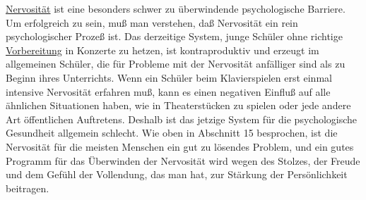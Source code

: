\hyperref[c1iii15]{Nervosität} ist eine besonders schwer zu überwindende psychologische Barriere.
Um erfolgreich zu sein, muß man verstehen, daß Nervosität ein rein psychologischer Prozeß ist.
Das derzeitige System, junge Schüler ohne richtige \hyperref[c1iii14]{Vorbereitung} in Konzerte zu hetzen, ist kontraproduktiv und erzeugt im allgemeinen Schüler, die für Probleme mit der Nervosität anfälliger sind als zu Beginn ihres Unterrichts.
Wenn ein Schüler beim Klavierspielen erst einmal intensive Nervosität erfahren muß, kann es einen negativen Einfluß auf alle ähnlichen Situationen haben, wie in Theaterstücken zu spielen oder jede andere Art öffentlichen Auftretens.
Deshalb ist das jetzige System für die psychologische Gesundheit allgemein schlecht.
Wie oben in Abschnitt 15 besprochen, ist die Nervosität für die meisten Menschen ein gut zu lösendes Problem, und ein gutes Programm für das Überwinden der Nervosität wird wegen des Stolzes, der Freude und dem Gefühl der Vollendung, das man hat, zur Stärkung der Persönlichkeit beitragen.

